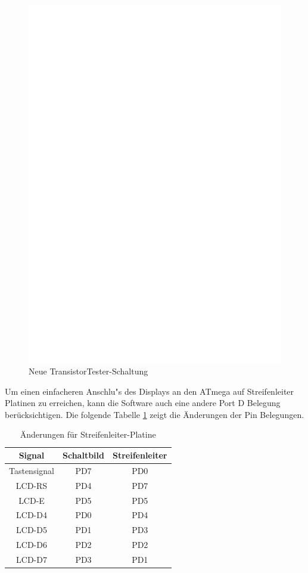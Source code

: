 \begin{figure}[H]
\centering
\includegraphics[width=18cm]{../FIG/ttester.eps}
\caption{Neue TransistorTester-Schaltung}
\label{fig:ttester}
\end{figure}

Um einen einfacheren Anschlu"s des Displays an den ATmega auf Streifenleiter Platinen zu erreichen,
kann die Software auch eine andere Port D Belegung ber\"ucksichtigen.
Die folgende Tabelle \ref{tab:grid-change} zeigt die \"Anderungen der Pin Belegungen.

\begin{table}[H]
  \begin{center}
    \begin{tabular}{| c | c | c |}
    \hline
       Signal & Schaltbild & Streifenleiter\\
    \hline
    Tastensignal  &  PD7   &  PD0 \\
    LCD-RS    &  PD4      & PD7 \\
    LCD-E     &  PD5   & PD5 \\
    LCD-D4    &  PD0   & PD4 \\
    LCD-D5    &  PD1   & PD3 \\
    LCD-D6    &  PD2   & PD2 \\
    LCD-D7    &  PD3   & PD1 \\
    \hline
    \end{tabular}
  \end{center}
  \caption{\"Anderungen f\"ur Streifenleiter-Platine}
  \label{tab:grid-change}
\end{table}


